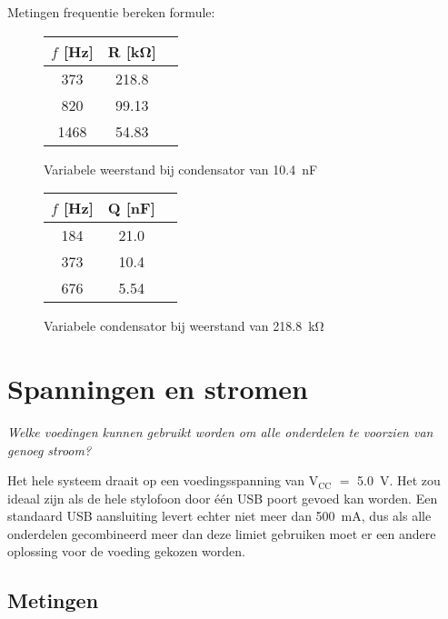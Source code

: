 \documentclass[12pt, a4paper, dutch]{article}
\newcommand{\sub}[1]{$_{\text{#1}}$}
\begin{document}
Metingen frequentie bereken formule:

\begin{figure}[H]
\centering
\begin{tabular}{ccc}
\toprule
$f$ [\si{\hertz}] & R [\si{\kilo\ohm}]\\
\midrule
\num{373} & \num{218.8} \\
\num{820} & \num{99.13} \\
\num{1468} & \num{54.83} \\
\bottomrule
\end{tabular}
\caption{Variabele weerstand bij condensator van \SI{10.4}{\nano\farad}}
\end{figure}

\begin{figure}[H]
\centering
\begin{tabular}{ccc}
\toprule
$f$ [\si{\hertz}] & Q [\si{\nano\farad}]\\
\midrule
\num{184} & \num{21.0} \\
\num{373} & \num{10.4} \\
\num{676} & \num{5.54} \\
\bottomrule
\end{tabular}
\caption{Variabele condensator bij weerstand van \SI{218.8}{\kilo\ohm}}
\end{figure}

\section{Spanningen en stromen}

\textit{Welke voedingen kunnen gebruikt worden om alle onderdelen te voorzien van
genoeg stroom?}

Het hele systeem draait op een voedingsspanning van V\sub{CC} $=$ \SI{5.0}{\volt}.
Het zou ideaal zijn als de hele stylofoon door \'e\'en USB poort gevoed kan worden.
Een standaard USB aansluiting levert echter niet meer dan \SI{500}{\milli\ampere},
dus als alle onderdelen gecombineerd meer dan deze limiet gebruiken moet er een
andere oplossing voor de voeding gekozen worden.

\subsection{Metingen}
\end{document}
